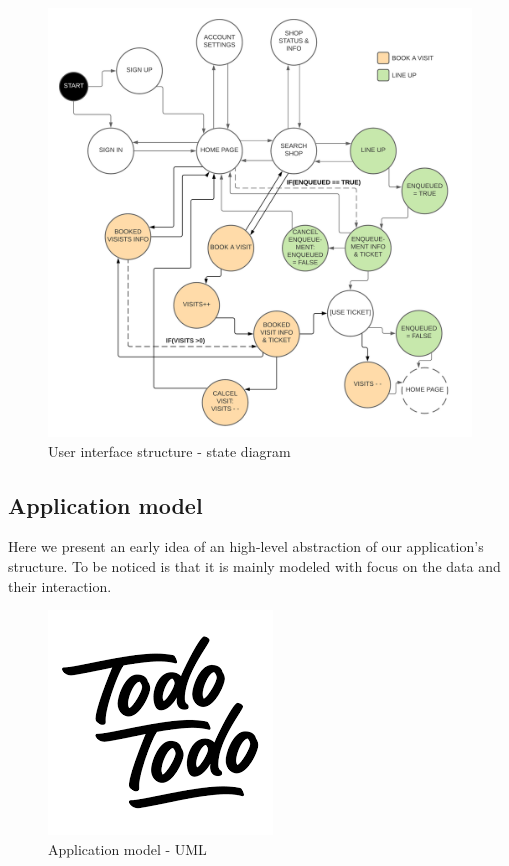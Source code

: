 \begin{figure}[h!]
    \centering
    \includegraphics[width=\textwidth]{Images/statediagrams/userinterface.png}
    \caption{\label{fig:userinterfacestructure}{User interface structure - state diagram}}
\end{figure}

\FloatBarrier

\subsection{Application model}
\label{subsect:applicationstructure}

Here we present an early idea of an high-level abstraction of our application's structure. To be noticed is that it is mainly modeled with focus on the data and their interaction.

\begin{figure}[h!]
    \centering
    \includegraphics[width=\textwidth]{Images/uml/todo.png}
    \caption{\label{fig:applicationmodel}{Application model - UML}}
\end{figure}